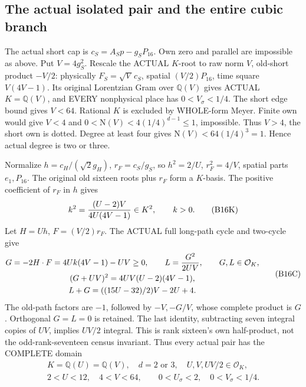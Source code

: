 \subsection{The actual isolated pair and the entire cubic branch}
\label{app:arithB16cubic}

The actual short cap is
\(c_S=A_Sp-g_SP_{16}\).
Own zero and parallel are impossible as above.
Put \(V=4g_S^2\).
Rescale the ACTUAL \(K\)-root to raw norm \(V\),
old-short product \(-V/2\):
physically \(F_S=\sqrt V\,c_S\), spatial
\((V/2)P_{16}\), time square \(V(4V-1)\).
Its original Lorentzian Gram over \(\mathbb Q(V)\)
gives ACTUAL \(K=\mathbb Q(V)\), and EVERY
nonphysical place has \(0<V_\sigma<1/4\).
The short edge bound gives \(V<64\).
Rational \(K\) is excluded by WHOLE-form Meyer.
Finite own would give \(V<4\) and
\(0<\mathrm N(V)<4(1/4)^{d-1}\le1\), impossible.
Thus \(V>4\), the short own is dotted.
Degree at least four gives
\(\mathrm N(V)<64(1/4)^3=1\).
Hence actual degree is two or three.

Normalize \(h=c_H/(\sqrt2g_H)\),
\(r_F=c_S/g_S\), so
\(h^2=2/U\), \(r_F^2=4/V\), spatial parts
\(e_1,P_{16}\).
The original old sixteen roots plus \(r_F\)
form a \(K\)-basis.
The positive coefficient of \(r_F\) in \(h\) gives
\[
                   k^2={(U-2)V\over4U(4V-1)}\in K^2,
                   \qquad k>0 .
\tag{B16K}\label{eq:arithB16square}
\]
Let \(H=Uh\), \(F=(V/2)r_F\).
The ACTUAL full long-path cycle and two-cycle give
\[
 \begin{gathered}
 G=-2H\cdot F=4Uk(4V-1)-UV\ge0,\qquad
 L={G^2\over2UV},\qquad G,L\in\mathcal O_K,\\
 (G+UV)^2=4UV(U-2)(4V-1),\\
 L+G=((15U-32)/2)V-2U+4 .
 \end{gathered}
\tag{B16C}\label{eq:arithB16cycles}
\]
The old-path factors are \(-1\), followed by
\(-V,-G/V\), whose complete product is \(G\).
Orthogonal \(G=L=0\) is retained.
The last identity, subtracting seven integral
copies of \(UV\), implies \(UV/2\) integral.
This is rank sixteen's own half-product, not
the odd-rank-seventeen census invariant.
Thus every actual pair has the COMPLETE domain
\[
 \begin{gathered}
 K=\mathbb Q(U)=\mathbb Q(V),\quad d=2\text{ or }3,\quad
 U,V,UV/2\in\mathcal O_K,\\
 2<U<12,\quad4<V<64,\qquad
 0<U_\sigma<2,\quad0<V_\sigma<1/4 .
 \end{gathered}
\]

